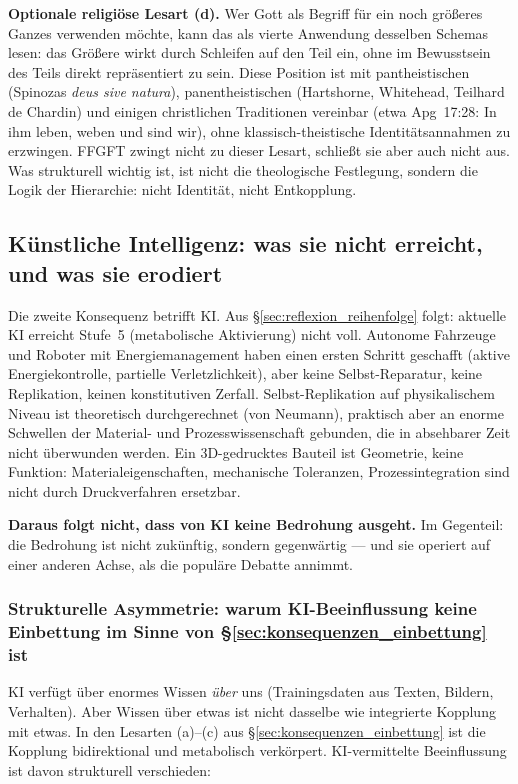 \textbf{Optionale religiöse Lesart (d).} Wer \glqq Gott\grqq{} als Begriff für ein noch größeres Ganzes verwenden möchte, kann das als vierte Anwendung desselben Schemas lesen: das Größere wirkt durch Schleifen auf den Teil ein, ohne im Bewusstsein des Teils direkt repräsentiert zu sein. Diese Position ist mit pantheistischen (Spinozas \emph{deus sive natura}), panentheistischen (Hartshorne, Whitehead, Teilhard de Chardin) und einigen christlichen Traditionen vereinbar (etwa Apg~17:28: \glqq In ihm leben, weben und sind wir\grqq{}), ohne klassisch-theistische Identitätsannahmen zu erzwingen. FFGFT zwingt nicht zu dieser Lesart, schließt sie aber auch nicht aus. Was strukturell wichtig ist, ist nicht die theologische Festlegung, sondern die Logik der Hierarchie: nicht Identität, nicht Entkopplung.

\subsection{Künstliche Intelligenz: was sie nicht erreicht, und was sie erodiert}\label{sec:konsequenzen_ki}

Die zweite Konsequenz betrifft KI. Aus \S\ref{sec:reflexion_reihenfolge} folgt: aktuelle KI erreicht Stufe~5 (metabolische Aktivierung) nicht voll. Autonome Fahrzeuge und Roboter mit Energiemanagement haben einen ersten Schritt geschafft (aktive Energiekontrolle, partielle Verletzlichkeit), aber keine Selbst-Reparatur, keine Replikation, keinen konstitutiven Zerfall. Selbst-Replikation auf physikalischem Niveau ist theoretisch durchgerechnet (von Neumann), praktisch aber an enorme Schwellen der Material- und Prozesswissenschaft gebunden, die in absehbarer Zeit nicht überwunden werden. Ein 3D-gedrucktes Bauteil ist Geometrie, keine Funktion: Materialeigenschaften, mechanische Toleranzen, Prozessintegration sind nicht durch Druckverfahren ersetzbar.

\textbf{Daraus folgt nicht, dass von KI keine Bedrohung ausgeht.} Im Gegenteil: die Bedrohung ist nicht zukünftig, sondern gegenwärtig --- und sie operiert auf einer anderen Achse, als die populäre Debatte annimmt.

\subsubsection*{Strukturelle Asymmetrie: warum KI-Beeinflussung keine Einbettung im Sinne von §\ref{sec:konsequenzen_einbettung} ist}

KI verfügt über enormes Wissen \emph{über} uns (Trainingsdaten aus Texten, Bildern, Verhalten). Aber Wissen über etwas ist nicht dasselbe wie integrierte Kopplung mit etwas. In den Lesarten (a)--(c) aus \S\ref{sec:konsequenzen_einbettung} ist die Kopplung bidirektional und metabolisch verkörpert. KI-vermittelte Beeinflussung ist davon strukturell verschieden:

